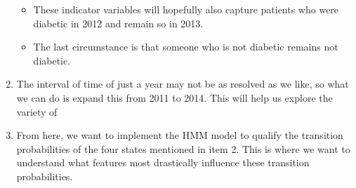 \documentclass{article}
\begin{document}
\begin{enumerate}
\begin{itemize}
\item These indicator variables will hopefully also capture patients who were diabetic in 2012 and remain so in 2013. 

\item The last circumstance is that someone who is not diabetic remains not diabetic. 
\end{itemize}

\item 	The interval of time of just a year may not be as resolved as we like, so what we can do is expand this from 2011 to 2014. This will help us explore the variety of 

\item From here, we want to implement the HMM model to qualify the transition probabilities of the four states mentioned in item 2. This is where we want to understand what features most drastically influence these transition probabilities. 
\end{enumerate}
\end{document}
